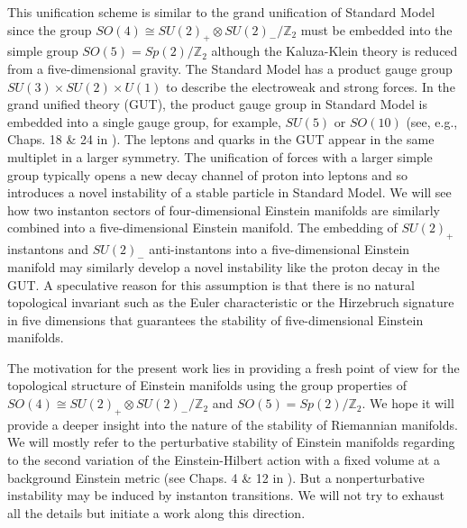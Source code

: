 \documentclass[12pt,epsf]{article}
\begin{document}
This unification scheme is similar to the grand unification of Standard Model
since the group $SO(4) \cong SU(2)_+ \otimes SU(2)_-/\mathbb{Z}_2$ must be embedded
into the simple group $SO(5) = Sp(2)/\mathbb{Z}_2$ although the Kaluza-Klein theory
is reduced from a five-dimensional gravity.
The Standard Model has a product gauge group $SU(3) \times SU(2) \times U(1)$ to describe
the electroweak and strong forces.
In the grand unified theory (GUT), the product gauge group in Standard Model is embedded into a single gauge group,
for example, $SU(5)$ or $SO(10)$ (see, e.g., Chaps. 18 \& 24 in \cite{georgi-book}).
The leptons and quarks in the GUT appear in the same multiplet in a larger symmetry.
The unification of forces with a larger simple group typically opens a new decay channel
of proton into leptons and so introduces a novel instability of a stable particle in Standard Model.
We will see how two instanton sectors of four-dimensional Einstein manifolds are similarly combined into
a five-dimensional Einstein manifold. The embedding of $SU(2)_+$ instantons and $SU(2)_-$ anti-instantons
into a five-dimensional Einstein manifold may similarly develop a novel instability like the proton decay
in the GUT. A speculative reason for this assumption is that
there is no natural topological invariant such as the Euler characteristic
or the Hirzebruch signature in five dimensions \cite{book-besse,egh-report} that
guarantees the stability of five-dimensional Einstein manifolds.




The motivation for the present work lies in providing a fresh point of view for the topological structure
of Einstein manifolds using the group properties of $SO(4) \cong SU(2)_+ \otimes SU(2)_-/\mathbb{Z}_2$ and
$SO(5) = Sp(2)/\mathbb{Z}_2$.
We hope it will provide a deeper insight into the nature of the stability of Riemannian manifolds.
We will mostly refer to the perturbative stability of Einstein manifolds regarding to the second variation of 
the Einstein-Hilbert action with a fixed volume at a background Einstein metric (see Chaps. 4 \& 12 in \cite{book-besse}).
But a nonperturbative instability may be induced by instanton transitions.
We will not try to exhaust all the details but initiate a work along this direction.
\end{document}

